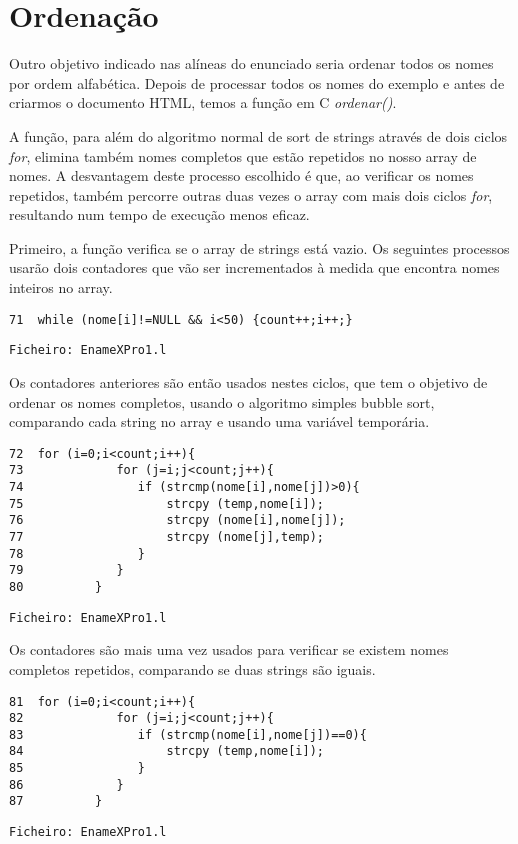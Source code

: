 \documentclass[11pt,a4paper]{report}
\begin{document}
\pagebreak
\section{Ordenação}
Outro objetivo indicado nas alíneas do enunciado seria ordenar todos os nomes por ordem alfabética. Depois de processar todos os nomes do exemplo e antes de criarmos o documento HTML, temos a função em C \emph{ordenar()}.

A função, para além do algoritmo normal de sort de strings através de dois ciclos \emph{for}, elimina também nomes completos que estão repetidos no nosso array de nomes. A desvantagem deste processo escolhido é que, ao verificar os nomes repetidos, também percorre outras duas vezes o array com mais dois ciclos \emph{for}, resultando num tempo de execução menos eficaz.

Primeiro, a função verifica se o array de strings está vazio. Os seguintes processos usarão dois contadores que vão ser incrementados à medida que encontra nomes inteiros no array.
\begin{verbatim}
71  while (nome[i]!=NULL && i<50) {count++;i++;}
\end{verbatim}
\begin{flushright}
\texttt{Ficheiro: EnameXPro1.l}
\end{flushright}

Os contadores anteriores são então usados nestes ciclos, que tem o objetivo de ordenar os nomes completos, usando o algoritmo simples bubble sort, comparando cada string no array e usando uma variável temporária.
\begin{verbatim}
72  for (i=0;i<count;i++){
73             for (j=i;j<count;j++){
74                if (strcmp(nome[i],nome[j])>0){
75                    strcpy (temp,nome[i]);
76                    strcpy (nome[i],nome[j]);
77                    strcpy (nome[j],temp);
78                }
79             }
80          }
\end{verbatim}
\begin{flushright}
\texttt{Ficheiro: EnameXPro1.l}
\end{flushright}


Os contadores são mais uma vez usados para verificar se existem nomes completos repetidos, comparando se duas strings são iguais.

\begin{verbatim}
81  for (i=0;i<count;i++){
82             for (j=i;j<count;j++){
83                if (strcmp(nome[i],nome[j])==0){
84                    strcpy (temp,nome[i]);
85                }
86             }
87          }
\end{verbatim}
\begin{flushright}
\texttt{Ficheiro: EnameXPro1.l}
\end{flushright}
\end{document}
